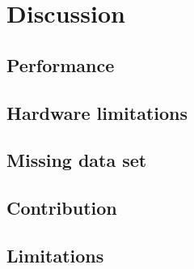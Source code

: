 \chapter{Discussion}



\section{Performance}\label{chap:discussperformance}

\section{Hardware limitations}

\section{Missing data set}


\section{Contribution}

\section{Limitations}